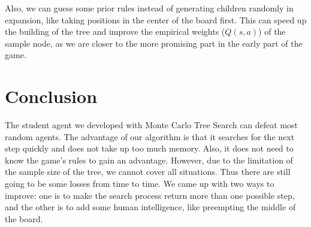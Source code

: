 \documentclass[twoside,11pt]{article}
\begin{document}
Also, we can guess some prior rules instead of generating children randomly in expansion, like taking positions in the center of the board first. This can speed up the building of the tree and improve the empirical weights (\(Q(s,a)\)) of the sample node, as we are closer to the more promising part in the early part of the game.

\section{Conclusion}
The student agent we developed with Monte Carlo Tree Search can defeat most random agents. The advantage of our algorithm is that it searches for the next step quickly and does not take up too much memory. Also, it does not need to know the game's rules to gain an advantage. However, due to the limitation of the sample size of the tree, we cannot cover all situations. Thus there are still going to be some losses from time to time. We came up with two ways to improve: one is to make the search process return more than one possible step, and the other is to add some human intelligence, like preempting the middle of the board.



\end{document}

